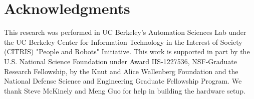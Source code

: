 \documentclass[10pt, conference]{ieeeconf}      %
\begin{document}
 \section{Acknowledgments} 
This research was performed in UC Berkeley's Automation Sciences Lab under the UC Berkeley Center for Information Technology in the Interest of Society (CITRIS) "People and Robots" Initiative. This work is supported in part by the U.S. National Science Foundation under Award IIS-1227536, NSF-Graduate Research Fellowship, by the Knut and Alice Wallenberg Foundation and the National Defense Science and Engineering Graduate Fellowship Program. We thank Steve McKinely and Meng Guo for help in building the hardware setup.  

  


\end{document}
